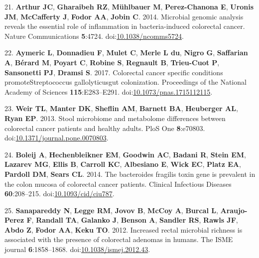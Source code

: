 \documentclass[12pt,]{article}
\begin{document}
\hypertarget{ref-ecoli_Arthur_2014}{}
21. \textbf{Arthur JC}, \textbf{Gharaibeh RZ}, \textbf{Mühlbauer M},
\textbf{Perez-Chanona E}, \textbf{Uronis JM}, \textbf{McCafferty J},
\textbf{Fodor AA}, \textbf{Jobin C}. 2014. Microbial genomic analysis
reveals the essential role of inflammation in bacteria-induced
colorectal cancer. Nature Communications \textbf{5}:4724.
doi:\href{https://doi.org/10.1038/ncomms5724}{10.1038/ncomms5724}.

\hypertarget{ref-strep_Aymeric_2017}{}
22. \textbf{Aymeric L}, \textbf{Donnadieu F}, \textbf{Mulet C},
\textbf{Merle L du}, \textbf{Nigro G}, \textbf{Saffarian A},
\textbf{Bérard M}, \textbf{Poyart C}, \textbf{Robine S},
\textbf{Regnault B}, \textbf{Trieu-Cuot P}, \textbf{Sansonetti PJ},
\textbf{Dramsi S}. 2017. Colorectal cancer specific conditions
promoteStreptococcus gallolyticusgut colonization. Proceedings of the
National Academy of Sciences \textbf{115}:E283--E291.
doi:\href{https://doi.org/10.1073/pnas.1715112115}{10.1073/pnas.1715112115}.

\hypertarget{ref-weir_stool_2013}{}
23. \textbf{Weir TL}, \textbf{Manter DK}, \textbf{Sheflin AM},
\textbf{Barnett BA}, \textbf{Heuberger AL}, \textbf{Ryan EP}. 2013.
Stool microbiome and metabolome differences between colorectal cancer
patients and healthy adults. PloS One \textbf{8}:e70803.
doi:\href{https://doi.org/10.1371/journal.pone.0070803}{10.1371/journal.pone.0070803}.

\hypertarget{ref-bfrag_Boleij_2014}{}
24. \textbf{Boleij A}, \textbf{Hechenbleikner EM}, \textbf{Goodwin AC},
\textbf{Badani R}, \textbf{Stein EM}, \textbf{Lazarev MG}, \textbf{Ellis
B}, \textbf{Carroll KC}, \textbf{Albesiano E}, \textbf{Wick EC},
\textbf{Platz EA}, \textbf{Pardoll DM}, \textbf{Sears CL}. 2014. The
bacteroides fragilis toxin gene is prevalent in the colon mucosa of
colorectal cancer patients. Clinical Infectious Diseases
\textbf{60}:208--215.
doi:\href{https://doi.org/10.1093/cid/ciu787}{10.1093/cid/ciu787}.

\hypertarget{ref-sanapareddy_increased_2012}{}
25. \textbf{Sanapareddy N}, \textbf{Legge RM}, \textbf{Jovov B},
\textbf{McCoy A}, \textbf{Burcal L}, \textbf{Araujo-Perez F},
\textbf{Randall TA}, \textbf{Galanko J}, \textbf{Benson A},
\textbf{Sandler RS}, \textbf{Rawls JF}, \textbf{Abdo Z}, \textbf{Fodor
AA}, \textbf{Keku TO}. 2012. Increased rectal microbial richness is
associated with the presence of colorectal adenomas in humans. The ISME
journal \textbf{6}:1858--1868.
doi:\href{https://doi.org/10.1038/ismej.2012.43}{10.1038/ismej.2012.43}.
\end{document}

